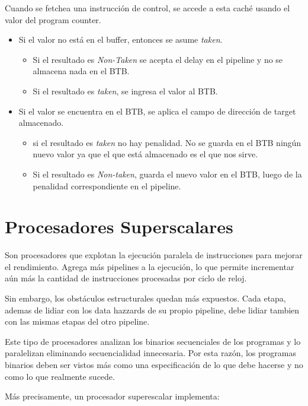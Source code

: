 \begin{itemize}
	Cuando se fetchea una instrucción de control, se accede a esta caché usando el valor del program counter.
	\begin{itemize}
		\item Si el valor no está en el buffer, entonces se asume \textit{taken}.
		\begin{itemize}
			\item Si el resultado es \textit{Non-Taken} se acepta el delay en el pipeline y no se almacena nada en el BTB.
			\item Si el resultado es \textit{taken}, se ingresa el valor al BTB.
		\end{itemize}
		\item Si el valor se encuentra en el BTB, se aplica el campo de dirección de target almacenado.
		\begin{itemize}
			\item si el resultado es \textit{taken} no hay penalidad. No se guarda en el BTB ningún nuevo valor ya que el que está almacenado es el que nos sirve.
			\item Si el resultado es \textit{Non-taken}, guarda el nuevo valor en el BTB, luego de la penalidad correspondiente en el pipeline. 
		\end{itemize}
	\end{itemize}
\end{itemize}

\newpage
\section{Procesadores Superscalares}
Son procesadores que explotan la ejecución paralela de instrucciones para mejorar el rendimiento. Agrega más pipelines a la ejecución, lo que permite incrementar aún más la cantidad de instrucciones procesadas por ciclo de reloj.

Sin embargo, los obstáculos estructurales quedan más expuestos. Cada etapa, ademas de lidiar con los data hazzards de su propio pipeline, debe lidiar tambien con las mismas etapas del otro pipeline. 

Este tipo de procesadores analizan los binarios secuenciales de los programas y lo paralelizan eliminando secuencialidad innecesaria. Por esta razón, los programas binarios deben ser vistos más como una especificación de lo que debe hacerse y no como lo que realmente sucede.

Más precisamente, un procesador superescalar implementa:

